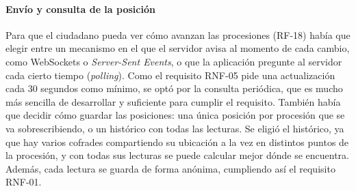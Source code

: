 \paragraph{Envío y consulta de la posición}
Para que el ciudadano pueda ver cómo avanzan las procesiones (RF-18) había que elegir entre un mecanismo en el que el servidor avisa al momento de cada cambio, como WebSockets o \emph{Server-Sent Events}, o que la aplicación pregunte al servidor cada cierto tiempo (\emph{polling}). Como el requisito RNF-05 pide una actualización cada 30 segundos como mínimo, se optó por la consulta periódica, que es mucho más sencilla de desarrollar y suficiente para cumplir el requisito. También había que decidir cómo guardar las posiciones: una única posición por procesión que se va sobrescribiendo, o un histórico con todas las lecturas. Se eligió el histórico, ya que hay varios cofrades compartiendo su ubicación a la vez en distintos puntos de la procesión, y con todas sus lecturas se puede calcular mejor dónde se encuentra. Además, cada lectura se guarda de forma anónima, cumpliendo así el requisito RNF-01.

